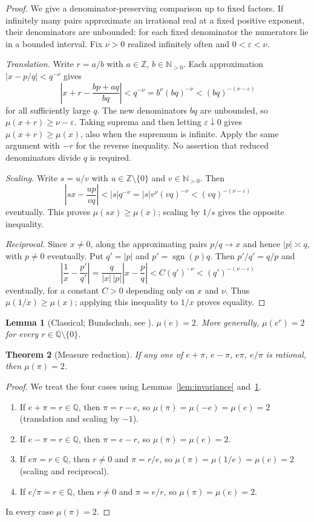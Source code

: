 \documentclass[11pt]{amsart}
\newtheorem{theorem}{Theorem}[section]
\newtheorem{lemma}[theorem]{Lemma}
\theoremstyle{definition}
\theoremstyle{remark}
\numberwithin{equation}{section}
\newcommand{\Q}{\mathbb{Q}}
\newcommand{\Z}{\mathbb{Z}}
\newcommand{\N}{\mathbb{N}}
\newcommand{\irr}{\mu}
\newcommand{\ee}{e}
\begin{document}
\begin{proof}
We give a denominator-preserving comparison up to fixed factors. If infinitely many pairs approximate an irrational real at a fixed positive exponent, their denominators are unbounded: for each fixed denominator the numerators lie in a bounded interval. Fix $\nu>0$ realized infinitely often and $0<\varepsilon<\nu$.

\emph{Translation.} Write $r=a/b$ with $a\in\Z$, $b\in\N_{>0}$. Each approximation $|x-p/q|<q^{-\nu}$ gives
\[
\left|x+r-\frac{bp+aq}{bq}\right|<q^{-\nu}
=b^\nu(bq)^{-\nu}<(bq)^{-(\nu-\varepsilon)}
\]
for all sufficiently large $q$. The new denominators $bq$ are unbounded, so $\irr(x+r)\ge\nu-\varepsilon$. Taking suprema and then letting $\varepsilon\downarrow0$ gives $\irr(x+r)\ge\irr(x)$, also when the supremum is infinite. Apply the same argument with $-r$ for the reverse inequality. No assertion that reduced denominators divide $q$ is required.

\emph{Scaling.} Write $s=u/v$ with $u\in\Z\setminus\{0\}$ and $v\in\N_{>0}$. Then
\[
\left|sx-\frac{up}{vq}\right|<|s|q^{-\nu}
=|s|v^\nu(vq)^{-\nu}<(vq)^{-(\nu-\varepsilon)}
\]
eventually. This proves $\irr(sx)\ge\irr(x)$; scaling by $1/s$ gives the opposite inequality.

\emph{Reciprocal.} Since $x\ne0$, along the approximating pairs $p/q\to x$ and hence $|p|\asymp q$, with $p\ne0$ eventually. Put $q'=|p|$ and $p'=\operatorname{sgn}(p)q$. Then $p'/q'=q/p$ and
\[
\left|\frac1x-\frac{p'}{q'}\right|
=\frac{q}{|x|\,|p|}\left|x-\frac pq\right|
<C(q')^{-\nu}<(q')^{-(\nu-\varepsilon)}
\]
eventually, for a constant $C>0$ depending only on $x$ and $\nu$. Thus $\irr(1/x)\ge\irr(x)$; applying this inequality to $1/x$ proves equality.
\end{proof}

\begin{lemma}[Classical; Bundschuh, see {\cite{CNU2024}}]\label{lem:mue}
$\irr(\ee)=2$. More generally, $\irr(\ee^r)=2$ for every $r\in\Q\setminus\{0\}$.
\end{lemma}

\begin{theorem}[Measure reduction]\label{thm:measure-reduction}
If any one of $e+\pi$, $e-\pi$, $e\pi$, $e/\pi$ is rational, then $\irr(\pi)=2$.
\end{theorem}

\begin{proof}
We treat the four cases using Lemmas~\ref{lem:invariance} and~\ref{lem:mue}.
\begin{enumerate}
\item If $e+\pi=r\in\Q$, then $\pi=r-e$, so $\irr(\pi)=\irr(-e)=\irr(e)=2$ (translation and scaling by $-1$).
\item If $e-\pi=r\in\Q$, then $\pi=e-r$, so $\irr(\pi)=\irr(e)=2$.
\item If $e\pi=r\in\Q$, then $r\ne0$ and $\pi=r/e$, so $\irr(\pi)=\irr(1/e)=\irr(e)=2$ (scaling and reciprocal).
\item If $e/\pi=r\in\Q$, then $r\ne0$ and $\pi=e/r$, so $\irr(\pi)=\irr(e)=2$.
\end{enumerate}
In every case $\irr(\pi)=2$.
\end{proof}
\end{document}
